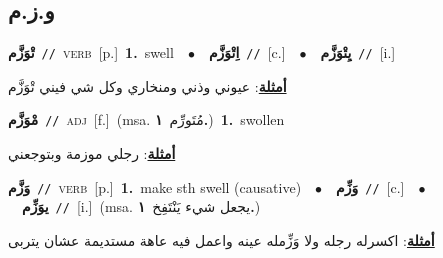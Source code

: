 \documentclass[10pt,a4paper,twoside]{article} %
\begin{document}
\begin{multicols}{2}
\vspace{-3mm}
\subsection*{\color{blue}\foreignlanguage{arabic}{و.ز.م}\color{blue}{}} 

{\setlength\topsep{0pt}\textbf{\foreignlanguage{arabic}{تْوَزَّم}}\ {\color{gray}\texttt{//}\color{black}}\ \textsc{verb}\ [p.]\ \textbf{1.}~swell\ \ $\bullet$\ \ \setlength\topsep{0pt}\textbf{\foreignlanguage{arabic}{اِتْوَزَّم}}\ {\color{gray}\texttt{//}\color{black}}\ [c.]\ \ $\bullet$\ \ \setlength\topsep{0pt}\textbf{\foreignlanguage{arabic}{يِتْوَزَّم}}\ {\color{gray}\texttt{//}\color{black}}\ [i.]\  \begin{flushright}\color{gray}\foreignlanguage{arabic}{\textbf{\underline{\foreignlanguage{arabic}{أمثلة}}}: عيوني وذني ومنخاري وكل شي فيني تْوَزَّم}\end{flushright}\color{black}} \vspace{2mm}

{\setlength\topsep{0pt}\textbf{\foreignlanguage{arabic}{مْوَزَّم}}\ {\color{gray}\texttt{//}\color{black}}\ \textsc{adj}\ [f.]\ \color{gray}(msa. \foreignlanguage{arabic}{مُتَورِّم}~\foreignlanguage{arabic}{\textbf{١.}})\color{black}\ \textbf{1.}~swollen\  \begin{flushright}\color{gray}\foreignlanguage{arabic}{\textbf{\underline{\foreignlanguage{arabic}{أمثلة}}}: رجلي موزمة وبتوجعني}\end{flushright}\color{black}} \vspace{2mm}

{\setlength\topsep{0pt}\textbf{\foreignlanguage{arabic}{وَزَّم}}\ {\color{gray}\texttt{//}\color{black}}\ \textsc{verb}\ [p.]\ \textbf{1.}~make sth swell (causative)\ \ $\bullet$\ \ \setlength\topsep{0pt}\textbf{\foreignlanguage{arabic}{وَزِّم}}\ {\color{gray}\texttt{//}\color{black}}\ [c.]\ \ $\bullet$\ \ \setlength\topsep{0pt}\textbf{\foreignlanguage{arabic}{يوَزِّم}}\ {\color{gray}\texttt{//}\color{black}}\ [i.]\ \color{gray}(msa. \foreignlanguage{arabic}{يجعل شيء يَنْتَفِخ}~\foreignlanguage{arabic}{\textbf{١.}})\color{black}\  \begin{flushright}\color{gray}\foreignlanguage{arabic}{\textbf{\underline{\foreignlanguage{arabic}{أمثلة}}}: اكسرله رجله ولا وَزِّمله عينه واعمل فيه عاهة مستديمة عشان يتربى}\end{flushright}\color{black}} \vspace{2mm}


\end{multicols}
\end{document}

